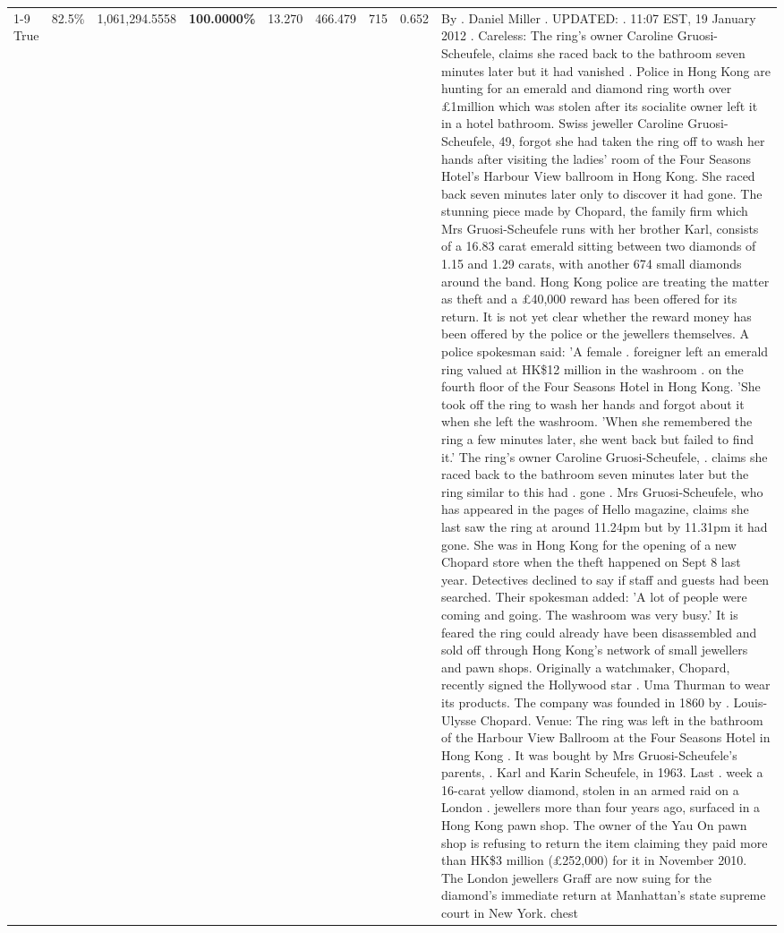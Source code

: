 \begin{table}[H]
\begin{tabular}{lllrlllll}
\cline{1-9}
True & 82.5\% & 1,061,294.5558 & \bfseries \color{red} 100.0000\% & 13.270 & 466.479 & 715 & 0.652 & By . Daniel Miller . UPDATED: . 11:07 EST, 19 January 2012 . Careless: The ring's owner Caroline Gruosi-Scheufele, claims she raced back to the bathroom seven minutes later but it had vanished . Police in Hong Kong are hunting for an emerald and diamond ring worth over £1million which was stolen after its socialite owner left it in a hotel bathroom. Swiss jeweller Caroline Gruosi-Scheufele, 49, forgot she had taken the ring off to wash her hands after visiting the ladies' room of the Four Seasons Hotel's Harbour View ballroom in Hong Kong. She raced back seven minutes later only to discover it had gone. The stunning piece made by Chopard, the family firm which Mrs Gruosi-Scheufele runs with her brother Karl, consists of a 16.83 carat emerald sitting between two diamonds of 1.15 and 1.29 carats, with another 674 small diamonds around the band. Hong Kong police are treating the matter as theft and a £40,000 reward has been offered for its return. It is not yet clear whether the reward money has been offered by the police or the jewellers themselves. A police spokesman said: 'A female . foreigner left an emerald ring valued at HK\$12 million in the washroom . on the fourth floor of the Four Seasons Hotel in Hong Kong. 'She took off the ring to wash her hands and forgot about it when she left the washroom. 'When she remembered the ring a few minutes later, she went back but failed to find it.' The ring's owner Caroline Gruosi-Scheufele, . claims she raced back to the bathroom seven minutes later but the ring similar to this had . gone . Mrs Gruosi-Scheufele, who has appeared in the pages of Hello magazine, claims she last saw the ring at around 11.24pm but by 11.31pm it had gone. She was in Hong Kong for the opening of a new Chopard store when the theft happened on Sept 8 last year. Detectives declined to say if staff and guests had been searched. Their spokesman added: 'A lot of people were coming and going. The washroom was very busy.' It is feared the ring could already have been disassembled and sold off through Hong Kong's network of small jewellers and pawn shops. Originally a watchmaker, Chopard, recently signed the Hollywood star . Uma Thurman to wear its products. The company was founded in 1860 by . Louis-Ulysse Chopard. Venue: The ring was left in the bathroom of the Harbour View Ballroom at the Four Seasons Hotel in Hong Kong . It was bought by Mrs Gruosi-Scheufele's  parents, . Karl and Karin Scheufele, in 1963. Last . week a 16-carat yellow diamond, stolen in an armed raid on a London . jewellers more than four years ago, surfaced in a Hong Kong pawn shop. The owner of the Yau On pawn shop is refusing to return the item claiming they paid more than HK\$3 million (£252,000) for it in November 2010. The London jewellers Graff are now suing for the diamond’s immediate return at Manhattan’s state supreme court in New York. chest \\

\end{tabular}
\end{table}
